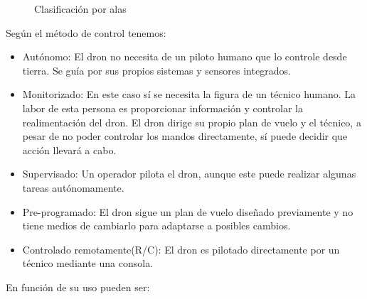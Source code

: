 \begin{figure}[H]
\centering
{}
\caption{Clasificación por alas}
\end{figure}

Según el método de control tenemos:

\begin{itemize}
\item Autónomo: El dron no necesita de un piloto humano que lo controle desde tierra. Se guía por sus propios sistemas y sensores integrados. 
\item Monitorizado: En este caso sí se necesita la figura de un técnico humano. La labor de esta persona es proporcionar información y controlar la realimentación del dron. El dron dirige su propio plan de vuelo y el técnico, a pesar de no poder controlar los mandos directamente, sí puede decidir que acción llevará a cabo.
\item Supervisado: Un operador pilota el dron, aunque este puede realizar algunas tareas autónomamente.
\item Pre-programado: El dron sigue un plan de vuelo diseñado previamente y no tiene medios de cambiarlo para adaptarse a posibles cambios.
\item Controlado remotamente(R/C): El dron es pilotado directamente por un técnico mediante una consola.
\end{itemize}

En función de su uso pueden ser:

